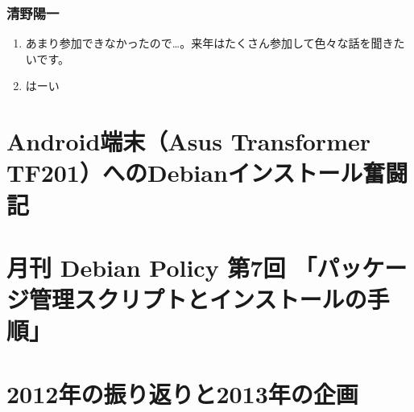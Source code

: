 \documentclass[cjk,dvipdfmx,10pt,compress,%
hyperref={bookmarks=true,bookmarksnumbered=true,bookmarksopen=false,%
colorlinks=false,%
pdftitle={第 67 回 関西 Debian 勉強会},%
pdfauthor={倉敷・のがた・佐々木・かわだ},%
pdfsubject={資料},%
}]{beamer}
\begin{document}
\begin{frame}
  \frametitle{ 清野陽一 }
  \begin{enumerate}
  \item あまり参加できなかったので…。来年はたくさん参加して色々な話を聞きたいです。
  \item はーい
  \end{enumerate}
\end{frame}


\section{Android端末（Asus Transformer TF201）へのDebianインストール奮闘記}


\section{月刊 Debian Policy 第7回 「パッケージ管理スクリプトとインストールの手順」}


\section{2012年の振り返りと2013年の企画}

\end{document}
